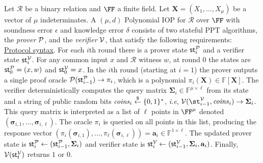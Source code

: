 \begin{definition} 
Let $\mathcal{R}$ be a binary relation and $\FF$ a finite field. Let $\mathbf{X} = (X_1, \ldots, X_\mu)$ be a vector of $\mu$ indeterminates. A $(\mu, d)$ Polynomial IOP for $\mathcal{R}$ over $\FF$ with soundness error $\epsilon$ and knowledge error $\delta$ consists of two stateful PPT algorithms, the \emph{prover} $\mathcal{P}$, and the \emph{verifier} $\mathcal{V}$, that satisfy the following requirements:\\

\noindent \underline{Protocol syntax}. 
For each $i$th round there is a prover state $\textsf{st}^\mathcal{P}_i$ and a verifier state $\textsf{st}^\mathcal{V}_i$. For any common input $x$ and $\mathcal{R}$ witness $w$, at round 0 the states are $\textsf{st}^\mathcal{P}_0 = (x, w)$ and $\textsf{st}^\mathcal{V}_0 = x$. 
In the $i$th round (starting at $i = 1$) the prover outputs a single proof oracle $\mathcal{P}(\textsf{st}^\mathcal{P}_{i-1}) \rightarrow \pi_i$, which is a polynomial $\pi_i(\mathbf{X}) \in \mathbb{F}[\mathbf{X}]$. 
The verifier deterministically computes the query matrix $\boldsymbol{\Sigma}_i \in \mathbb{F}^{\mu \times \ell}$ from its state and a string of public random bits $\mathit{coins}_i \overset{\$}{\gets} \{0,1\}^*$, \emph{i.e}, $\verifier(\st^\verifier_{i-1}, \mathit{coins}_i) \rightarrow \boldsymbol{\Sigma}_i$. This query matrix is interpreted as a list of $\ell$ points in $\FF^\mu$ denoted $(\boldsymbol{\sigma}_{i,1}, \ldots, \boldsymbol{\sigma}_{i, \ell})$.
The oracle $\pi_i$ is queried on all points in this list, producing the response vector
$(\pi_i(\boldsymbol{\sigma}_{i,1}), \ldots, \pi_\ell(\boldsymbol{\sigma}_{i, \ell})) = \mathbf{a}_i \in \mathbb{F}^{1 \times \ell}$. The updated prover state is $\textsf{st}^\mathcal{P}_i \leftarrow (\textsf{st}^\mathcal{P}_{i-1}, \boldsymbol{\Sigma}_i)$
and verifier state is $\textsf{st}^\mathcal{V}_i \leftarrow (\textsf{st}^\mathcal{V}_{i-1}, \boldsymbol{\Sigma}_i, \mathbf{a}_i)$. Finally, $\mathcal{V}(\textsf{st}^\mathcal{V}_t)$ returns $1$ or $0$. 


\end{definition}
